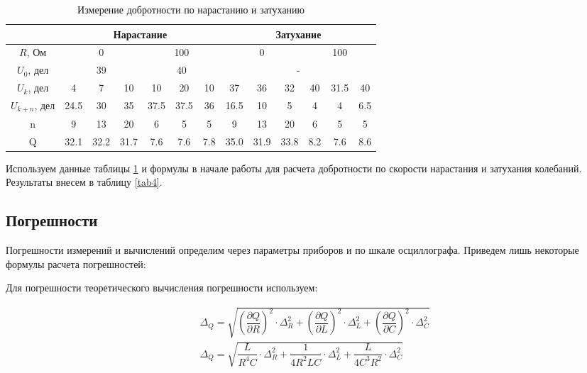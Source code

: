 \documentclass{lab}
\begin{document}
\begin{table}[H]
	\centering
	\renewcommand{\arraystretch}{1.3}
	\begin{tabular}{|c|c|c|c|c|c|c|c|c|c|c|c|c|}
		\hline
		& \multicolumn{6}{c|}{Нарастание} & \multicolumn{6}{c|}{Затухание} \\ \hline
		$R$, Ом & \multicolumn{3}{c|}{0} & \multicolumn{3}{c|}{100} & \multicolumn{3}{c|}{0} & \multicolumn{3}{c|}{100} \\ \hline
		$U_{0}$, дел & \multicolumn{3}{c|}{39} & \multicolumn{3}{c|}{40} & \multicolumn{6}{c|}{-} \\ \hline
		$U_{k}$, дел & 4 & 7 & 10 & 10 & 20 & 10 & 37 & 36 & 32 &40 & 31.5 & 40 \\ \hline
		$U_{k+n}$, дел & 24.5 & 30 & 35 & 37.5 & 37.5 & 36 & 16.5 & 10 & 5 & 4 & 4 & 6.5\\ \hline
		n & 9 & 13 & 20 & 6 & 5 & 5 & 9 & 13 & 20 & 6 & 5 & 5\\ \hline
		Q & 32.1 & 32.2 & 31.7 & 7.6 & 7.6 & 7.8 & 35.0 & 31.9 & 33.8 & 8.2 & 7.6 & 8.6\\ \hline
	\end{tabular}
	\caption{\footnotesize Измерение добротности по нарастанию и затуханию}
	\label{tab3}
	\renewcommand{\arraystretch}{1}
\end{table}

Используем данные таблицы \ref{tab3} и формулы в начале работы для расчета добротности по скорости нарастания и затухания колебаний. Результаты внесем в таблицу \ref{tab4}.

\subsection*{Погрешности}

Погрешности измерений и вычислений определим через параметры приборов и по шкале осциллографа. Приведем лишь некоторые формулы расчета погрешностей:

Для погрешности теоретического вычисления погрешности используем:

\begin{equation}
\begin{aligned}
	&\Delta_Q = \sqrt{\left( \dfrac{\partial Q}{\partial R} \right)^2 \cdot \Delta_R^2 + \left( \dfrac{\partial Q}{\partial L} \right)^2 \cdot \Delta_L^2 + \left( \dfrac{\partial Q}{\partial C} \right)^2 \cdot \Delta_C^2} \\
	&\Delta_Q = \sqrt{\dfrac{L}{R^4C} \cdot \Delta_R^2 + \dfrac{1}{4R^2LC} \cdot \Delta_L^2 + \dfrac{L}{4C^3R^2} \cdot \Delta_C^2}
\end{aligned}
\end{equation}
\end{document}
